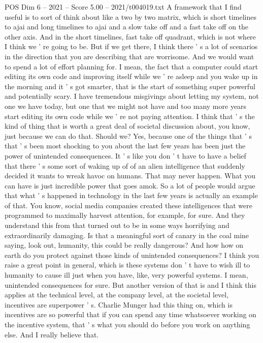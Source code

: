 \begin{textsample}{POS Dim 6 – 2021 – Score 5.00 – 2021/t004019.txt}
A framework that I find useful is to sort of think about like a two by two matrix, which is short timelines to ajai and long timelines to ajai and a slow take off and a fast take off on the other axis.
And in the short timelines, fast take off quadrant, which is not where I think we ' re going to be.
But if we get there, I think there ' s a lot of scenarios in the direction that you are describing that are worrisome.
And we would want to spend a lot of effort planning for.
I mean, the fact that a computer could start editing its own code and improving itself while we ' re asleep and you wake up in the morning and it ' s got smarter, that is the start of something super powerful and potentially scary.
I have tremendous misgivings about letting my system, not one we have today, but one that we might not have and too many more years start editing its own code while we ' re not paying attention.
I think that ' s the kind of thing that is worth a great deal of societal discussion about, you know, just because we can do that.
Should we?
Yes, because one of the things that ' s that ' s been most shocking to you about the last few years has been just the power of unintended consequences.
It ' s like you don ' t have to have a belief that there ' s some sort of waking up of of an alien intelligence that suddenly decided it wants to wreak havoc on humans.
That may never happen.
What you can have is just incredible power that goes amok.
So a lot of people would argue that what ' s happened in technology in the last few years is actually an example of that.
You know, social media companies created these intelligences that were programmed to maximally harvest attention, for example, for sure.
And they understand this from that turned out to be in some ways horrifying and extraordinarily damaging.
Is that a meaningful sort of canary in the coal mine saying, look out, humanity, this could be really dangerous?
And how how on earth do you protect against those kinds of unintended consequences?
I think you raise a great point in general, which is these systems don ' t have to wish ill to humanity to cause ill just when you have, like, very powerful systems.
I mean, unintended consequences for sure.
But another version of that is and I think this applies at the technical level, at the company level, at the societal level, incentives are superpower ' s.
Charlie Munger had this thing on, which is incentives are so powerful that if you can spend any time whatsoever working on the incentive system, that ' s what you should do before you work on anything else.
And I really believe that.

\end{textsample}
